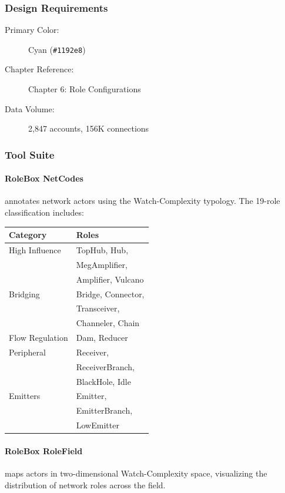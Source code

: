 \subsubsection{Design Requirements}

\begin{description}
    \item[Primary Color:] Cyan (\texttt{\#1192e8})
    \item[Chapter Reference:] Chapter 6: Role Configurations
    \item[Data Volume:] 2,847 accounts, 156K connections
\end{description}

\subsubsection{Tool Suite}

\paragraph{RoleBox NetCodes} annotates network actors using the Watch-Complexity typology. The 19-role classification includes:

\begin{margintable}
\small
\begin{tabular}{ll}
\toprule
\textbf{Category} & \textbf{Roles} \\
\midrule
High Influence & TopHub, Hub, \\
 & MegAmplifier, \\
 & Amplifier, Vulcano \\
Bridging & Bridge, Connector, \\
 & Transceiver, \\
 & Channeler, Chain \\
Flow Regulation & Dam, Reducer \\
Peripheral & Receiver, \\
 & ReceiverBranch, \\
 & BlackHole, Idle \\
Emitters & Emitter, \\
 & EmitterBranch, \\
 & LowEmitter \\
\bottomrule
\end{tabular}
\caption{Watch-Complexity role categories.}
\end{margintable}

\paragraph{RoleBox RoleField} maps actors in two-dimensional Watch-Complexity space, visualizing the distribution of network roles across the field.

